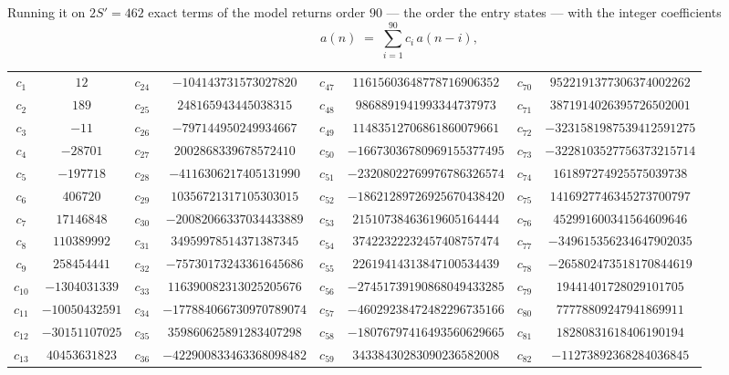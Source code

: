 \documentclass[11pt,a4paper]{article}
\theoremstyle{plain}
\theoremstyle{definition}
\begin{document}
Running it on $2S'=462$ exact terms of the model returns order $90$ --- the order the
entry states --- with the integer coefficients
\[
a(n)\;=\;\sum_{i=1}^{90}c_i\,a(n-i),
\]
\begin{center}\small
\begin{tabular}{cccccccc}
$c_{1}$ & $12$ & $c_{24}$ & $-104143731573027820$ & $c_{47}$ & $11615603648778716906352$ & $c_{70}$ & $9522191377306374002262$ \\
$c_{2}$ & $189$ & $c_{25}$ & $248165943445038315$ & $c_{48}$ & $9868891941993344737973$ & $c_{71}$ & $3871914026395726502001$ \\
$c_{3}$ & $-11$ & $c_{26}$ & $-797144950249934667$ & $c_{49}$ & $11483512706861860079661$ & $c_{72}$ & $-3231581987539412591275$ \\
$c_{4}$ & $-28701$ & $c_{27}$ & $2002868339678572410$ & $c_{50}$ & $-16673036780969155377495$ & $c_{73}$ & $-3228103527756373215714$ \\
$c_{5}$ & $-197718$ & $c_{28}$ & $-4116306217405131990$ & $c_{51}$ & $-23208022769976786326574$ & $c_{74}$ & $161897274925575039738$ \\
$c_{6}$ & $406720$ & $c_{29}$ & $10356721317105303015$ & $c_{52}$ & $-18621289726925670438420$ & $c_{75}$ & $1416927746345273700797$ \\
$c_{7}$ & $17146848$ & $c_{30}$ & $-20082066337034433889$ & $c_{53}$ & $21510738463619605164444$ & $c_{76}$ & $452991600341564609646$ \\
$c_{8}$ & $110389992$ & $c_{31}$ & $34959978514371387345$ & $c_{54}$ & $37422322232457408757474$ & $c_{77}$ & $-349615356234647902035$ \\
$c_{9}$ & $258454441$ & $c_{32}$ & $-75730173243361645686$ & $c_{55}$ & $22619414313847100534439$ & $c_{78}$ & $-265802473518170844619$ \\
$c_{10}$ & $-1304031339$ & $c_{33}$ & $116390082313025205676$ & $c_{56}$ & $-27451739190868049433285$ & $c_{79}$ & $19441401728029101705$ \\
$c_{11}$ & $-10050432591$ & $c_{34}$ & $-177884066730970789074$ & $c_{57}$ & $-46029238472482296735166$ & $c_{80}$ & $77778809247941869911$ \\
$c_{12}$ & $-30151107025$ & $c_{35}$ & $359860625891283407298$ & $c_{58}$ & $-18076797416493560629665$ & $c_{81}$ & $18280831618406190194$ \\
$c_{13}$ & $40453631823$ & $c_{36}$ & $-422900833463368098482$ & $c_{59}$ & $34338430283090236582008$ & $c_{82}$ & $-11273892368284036845$ \\

\end{tabular}
\end{center}
\end{document}
